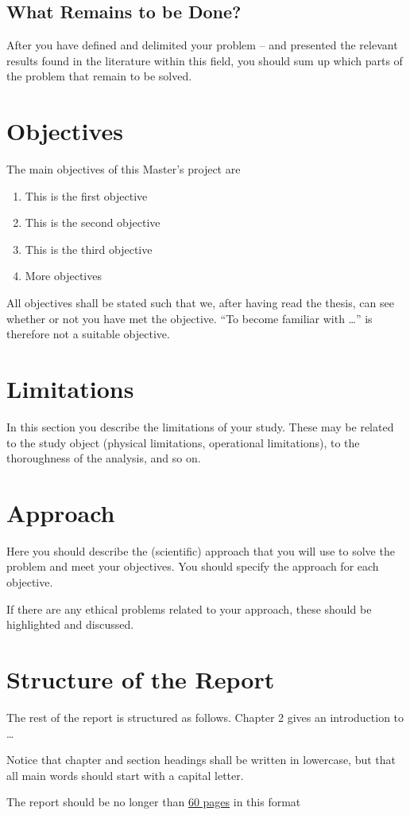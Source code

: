 \subsection*{What Remains to be Done?}
After you have defined and delimited your problem -- and presented the relevant results found in the literature within this field, you should sum up which parts of the problem that remain to be solved.
\section{Objectives}
The main objectives of this Master's project are
\begin{enumerate}
\item This is the first objective
\item This is the second objective
\item This is the third objective
\item More objectives
\end{enumerate}

All objectives shall be stated such that we, after having read the thesis, can see whether or not you have met the objective. ``To become familiar with \ldots'' is therefore not a suitable objective.

\section{Limitations}
In this section you describe the limitations of your study. These may be related to the study object (physical limitations, operational limitations), to the thoroughness of the analysis, and so on.

%
\section{Approach}
Here you should describe the (scientific) approach that you will use to solve the problem and meet your objectives. You should specify the approach for each objective.

If there are any ethical problems related to your approach, these should be highlighted and discussed.
\section{Structure of the Report}
The rest of the report is structured as follows. Chapter 2 gives an introduction to \ldots

\begin{remark}
Notice that chapter and section headings shall be written in lowercase, but that all main words should start with a capital letter.
\end{remark}


The report should be no longer than \underline{60 pages} in this format 